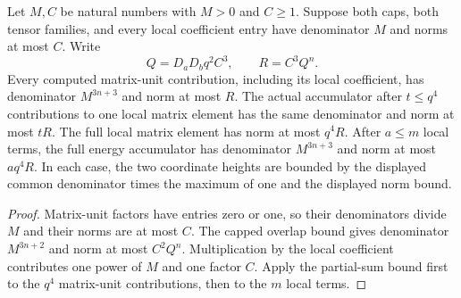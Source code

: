 \begin{lemma}
    \label{lem:lvv_local_energy_partial_sum_bounds}
    \leanok
    Let $M,C$ be natural numbers with $M>0$ and $C\ge1$. Suppose
    both caps, both tensor families, and every local coefficient
    entry have denominator $M$ and norms at most $C$. Write
    \[
        Q=D_aD_bq^2C^3,\qquad R=C^3Q^n.
    \]
    Every computed matrix-unit contribution, including its local
    coefficient, has denominator $M^{3n+3}$ and norm at most $R$.
    The actual accumulator after $t\le q^4$ contributions to one
    local matrix element has the same denominator and norm at most
    $tR$. The full local matrix element has norm at most $q^4R$.
    After $a\le m$ local terms, the full energy accumulator has
    denominator $M^{3n+3}$ and norm at most $aq^4R$. In each case,
    the two coordinate heights are bounded by the displayed common
    denominator times the maximum of one and the displayed norm bound.
\end{lemma}
\begin{proof}\leanok
    Matrix-unit factors have entries zero or one, so their denominators
    divide $M$ and their norms are at most $C$. The capped overlap
    bound gives denominator $M^{3n+2}$ and norm at most $C^2Q^n$.
    Multiplication by the local coefficient contributes one power of
    $M$ and one factor $C$. Apply the partial-sum bound first to the
    $q^4$ matrix-unit contributions, then to the $m$ local terms.
\end{proof}

